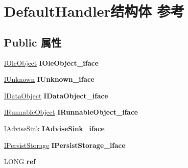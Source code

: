 \hypertarget{struct_default_handler}{}\section{Default\+Handler结构体 参考}
\label{struct_default_handler}
\subsection*{Public 属性}
\begin{DoxyCompactItemize}
\item 
\mbox{\label{struct_default_handler_aaa9c8bf23c74a1e5d6d17eec3b3aaa4a}} 
\hyperlink{interface_i_ole_object}{I\+Ole\+Object} {\bfseries I\+Ole\+Object\+\_\+iface}
\item 
\mbox{\label{struct_default_handler_a16650dfd3188b1aaedc9770f0c0edda1}} 
\hyperlink{interface_i_unknown}{I\+Unknown} {\bfseries I\+Unknown\+\_\+iface}
\item 
\mbox{\label{struct_default_handler_a45024b4066e55c6d3bb3c3d41a67f0ac}} 
\hyperlink{interface_i_data_object}{I\+Data\+Object} {\bfseries I\+Data\+Object\+\_\+iface}
\item 
\mbox{\label{struct_default_handler_a5970143f29d397a9e79f02682bf8b90d}} 
\hyperlink{interface_i_runnable_object}{I\+Runnable\+Object} {\bfseries I\+Runnable\+Object\+\_\+iface}
\item 
\mbox{\label{struct_default_handler_a34128b47c1d9988dca934c4273d1cfa8}} 
\hyperlink{interface_i_advise_sink}{I\+Advise\+Sink} {\bfseries I\+Advise\+Sink\+\_\+iface}
\item 
\mbox{\label{struct_default_handler_aeb9efddc813752cae21680e33e9a6efc}} 
\hyperlink{interface_i_persist_storage}{I\+Persist\+Storage} {\bfseries I\+Persist\+Storage\+\_\+iface}
\item 
\mbox{\label{struct_default_handler_a356781b356a0e9b49ed15a6b86e3d856}} 
L\+O\+NG {\bfseries ref}
\item 
\mbox{\label{struct_default_handler_a1548f6450e9d74694a1d4c5801e738d4}} 

\end{DoxyCompactItemize}
